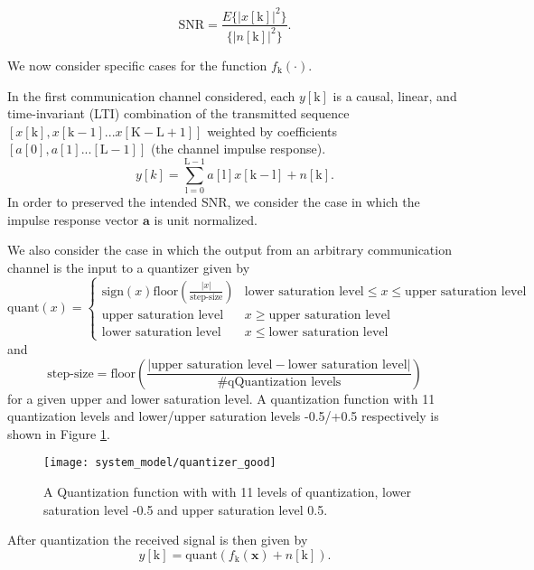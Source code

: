 \begin{equation*}
\text{SNR} = \frac{E\{|x[\text{k}]|^2\}}{\{|n[\text{k}]|^2\}}.
\end{equation*}
\par
We now consider specific cases for the function $f_{\text{k}}(\cdot)$. \par
In the first communication channel considered, each $y[\text{k}]$ is a causal, linear, and time-invariant (LTI) combination of the transmitted sequence $[x[\text{k}], x[\text{k}-1]... x[\text{K}-\text{L}+1]]$ weighted by coefficients $[a[0], a[1].. . [\text{L}-1]]$ (the channel impulse response). 
\begin{equation}\label{lti_channel}
y[k] = \sum_{\mathrm{\text{l}=0}}^{\mathrm{\text{L}-1}} a[\text{l}]x[\text{k}-\text{l}]+ n[\text{k}].
\end{equation}
In order to preserved the intended SNR, we consider the case in which the impulse response vector $\mathbf{a}$ is unit normalized.
\par
We also consider the case in which the output from an arbitrary communication channel is the input to a quantizer given by 
\[\text{quant}(x) = 
\begin{cases}
\text{sign}(x)\text{floor}\left(\frac{|x|}{\text{step-size}}\right)& \text{lower saturation level} \leq x \leq \text{upper saturation level}\\
\text{upper saturation level} & x \geq \text{upper saturation level}\\
\text{lower saturation level} & x \leq \text{lower saturation level}
\end{cases}
\]
 and  
 \begin{equation*}
  \text{step-size} =\text{floor}\left(\frac{|\text{upper saturation level}- \text{lower saturation level}|}{\text{\#qQuantization levels}}\right)
 \end{equation*} for a given upper and lower saturation level. A quantization function with 11 quantization levels and lower/upper saturation levels -0.5/+0.5 respectively is shown in Figure \ref{fig:Quantized Overlay}. 
  \begin{figure}[H]
\centering
	\texttt{[image: system\_model/quantizer\_good]}
			  \caption{A Quantization function with with 11 levels of quantization, lower saturation level -0.5 and upper saturation level 0.5. }
	  \label{fig:Quantized Overlay}
\end{figure}
 
After quantization the received signal is then given by 
\begin{equation}\label{lti_quantized_channel}
y[\text{k}] = \text{quant}(f_{\text{k}}(\mathbf{x}) + n[\text{k}]).
\end{equation}

